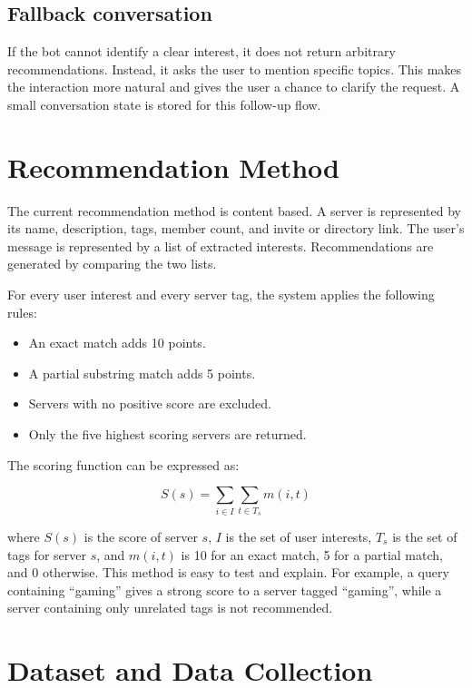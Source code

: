 \documentclass[11pt,a4paper]{article}
\begin{document}
\subsection{Fallback conversation}
If the bot cannot identify a clear interest, it does not return arbitrary recommendations. Instead, it asks the user to mention specific topics. This makes the interaction more natural and gives the user a chance to clarify the request. A small conversation state is stored for this follow-up flow.

\section{Recommendation Method}

The current recommendation method is content based. A server is represented by its name, description, tags, member count, and invite or directory link. The user's message is represented by a list of extracted interests. Recommendations are generated by comparing the two lists.

For every user interest and every server tag, the system applies the following rules:

\begin{itemize}
    \item An exact match adds 10 points.
    \item A partial substring match adds 5 points.
    \item Servers with no positive score are excluded.
    \item Only the five highest scoring servers are returned.
\end{itemize}

The scoring function can be expressed as:

\begin{equation}
    S(s) = \sum_{i \in I}\sum_{t \in T_s} m(i,t)
\end{equation}

where $S(s)$ is the score of server $s$, $I$ is the set of user interests, $T_s$ is the set of tags for server $s$, and $m(i,t)$ is 10 for an exact match, 5 for a partial match, and 0 otherwise. This method is easy to test and explain. For example, a query containing ``gaming'' gives a strong score to a server tagged ``gaming'', while a server containing only unrelated tags is not recommended.

\section{Dataset and Data Collection}
\end{document}
